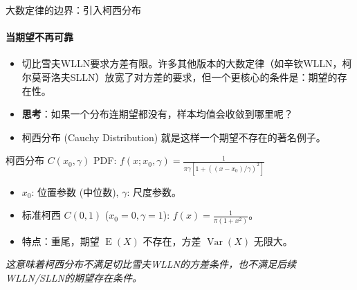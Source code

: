 \documentclass[UTF8]{beamer}
\DeclareMathOperator{\E}{\operatorname{E}}
\DeclareMathOperator{\Var}{\operatorname{Var}}
\begin{document}
\begin{frame}[shrink=10]{大数定律的边界：引入柯西分布}
    \framesubtitle{当期望不再可靠}
    \begin{itemize}
        \item 切比雪夫WLLN要求\alert{方差有限}。许多其他版本的大数定律（如辛钦WLLN，柯尔莫哥洛夫SLLN）放宽了对方差的要求，但一个更核心的条件是：\alert{期望的存在性}。
        \pause
        \item \textbf{思考}：如果一个分布连期望都没有，样本均值会收敛到哪里呢？
        \item \alert{柯西分布 (Cauchy Distribution)} 就是这样一个期望不存在的著名例子。
    \end{itemize}
    \pause
    \begin{block}{柯西分布 $C(x_0, \gamma)$}
        PDF: $f(x; x_0, \gamma) = \frac{1}{\pi\gamma [1 + ((x-x_0)/\gamma)^2]}$
        \begin{itemize}
            \item $x_0$: 位置参数 (中位数), $\gamma$: 尺度参数。
            \item 标准柯西 $C(0,1)$ ($x_0=0, \gamma=1$): $f(x) = \frac{1}{\pi (1+x^2)}$。
            \item 特点：重尾，\alert{期望 $\E(X)$ 不存在}，\alert{方差 $\Var(X)$ 无限大}。
        \end{itemize}
    \end{block}
    \pause
    \textit{这意味着柯西分布\alert{不满足}切比雪夫WLLN的方差条件，也不满足后续WLLN/SLLN的期望存在条件。}
\end{frame}
\end{document}
